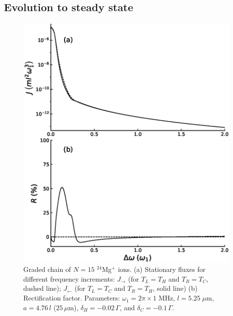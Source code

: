 \subsection{Evolution to steady state \label{Results_A}}

\begin{figure}[h]
    \includegraphics[width=\linewidth]{Figures/Graded_24Mg_FluxAndRectification_VS_FreqGradient.eps}
    \caption{Graded chain of $N=15$ $^{24}$Mg$^+$ ions. (a) Stationary fluxes for different frequency increments:
$J_\rightarrow$   (for $T_L = T_H$ and $T_R = T_C$, dashed line); $J_\leftarrow$ (for $T_L = T_C$ and $T_R = T_H$, solid line)
(b) Rectification factor. Parameters: $\omega_1 = 2 \pi \times 1$ MHz, $l = 5.25\;\mu$m, $a = 4.76\, l$ ($25\,\mu$m), $\delta_H = -0.02 \,\Gamma$, and $\delta_C = -0.1 \, \Gamma$.}
    \label{fig:RFG}
\end{figure}

